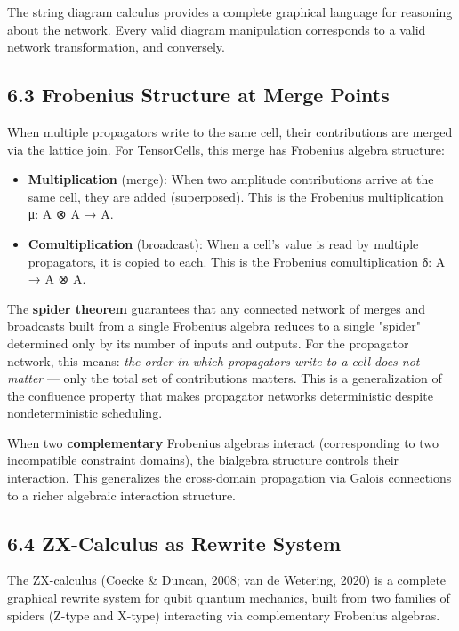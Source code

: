 \documentclass[11pt]{article}
\begin{document}
The string diagram calculus provides a complete graphical language for reasoning
about the network. Every valid diagram manipulation corresponds to a valid
network transformation, and conversely.
\subsection{6.3 Frobenius Structure at Merge Points}
\label{sec:orgab52be7}

When multiple propagators write to the same cell, their contributions are merged
via the lattice join. For TensorCells, this merge has Frobenius algebra structure:

\begin{itemize}
\item \textbf{Multiplication} (merge): When two amplitude contributions arrive at the same
cell, they are added (superposed). This is the Frobenius multiplication
μ: A ⊗ A → A.
\item \textbf{Comultiplication} (broadcast): When a cell's value is read by multiple
propagators, it is copied to each. This is the Frobenius comultiplication
δ: A → A ⊗ A.
\end{itemize}

The \textbf{spider theorem} guarantees that any connected network of merges and broadcasts
built from a single Frobenius algebra reduces to a single "spider" determined
only by its number of inputs and outputs. For the propagator network, this means:
\emph{the order in which propagators write to a cell does not matter} --- only the
total set of contributions matters. This is a generalization of the confluence
property that makes propagator networks deterministic despite nondeterministic
scheduling.

When two \textbf{complementary} Frobenius algebras interact (corresponding to two
incompatible constraint domains), the bialgebra structure controls their
interaction. This generalizes the cross-domain propagation via Galois connections
to a richer algebraic interaction structure.
\subsection{6.4 ZX-Calculus as Rewrite System}
\label{sec:org888961e}

The ZX-calculus (Coecke \& Duncan, 2008; van de Wetering, 2020) is a complete
graphical rewrite system for qubit quantum mechanics, built from two families of
spiders (Z-type and X-type) interacting via complementary Frobenius algebras.
\end{document}
